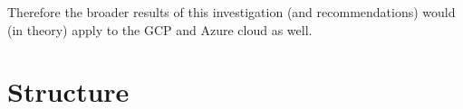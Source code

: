 Therefore the broader results of this investigation (and recommendations) would (in theory) apply to the GCP and Azure cloud as well.

\chapter{Structure}
